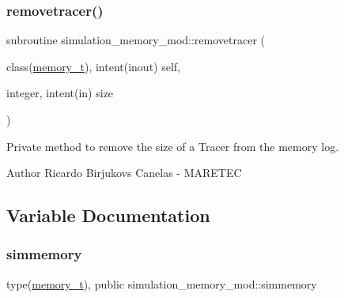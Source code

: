 \subsubsection{\texorpdfstring{removetracer()}{removetracer()}}
{\footnotesize\ttfamily subroutine simulation\+\_\+memory\+\_\+mod\+::removetracer (\begin{DoxyParamCaption}\item[{class(\hyperlink{structsimulation__memory__mod_1_1memory__t}{memory\+\_\+t}), intent(inout)}]{self,  }\item[{integer, intent(in)}]{size }\end{DoxyParamCaption})\hspace{0.3cm}{\ttfamily [private]}}



Private method to remove the size of a Tracer from the memory log. 

\begin{DoxyAuthor}{Author}
Ricardo Birjukovs Canelas -\/ M\+A\+R\+E\+T\+EC 
\end{DoxyAuthor}


\subsection{Variable Documentation}
\mbox{\label{namespacesimulation__memory__mod_af3e2714796469b4b1ec247569b184088}} 
\subsubsection{\texorpdfstring{simmemory}{simmemory}}
{\footnotesize\ttfamily type(\hyperlink{structsimulation__memory__mod_1_1memory__t}{memory\+\_\+t}), public simulation\+\_\+memory\+\_\+mod\+::simmemory}

